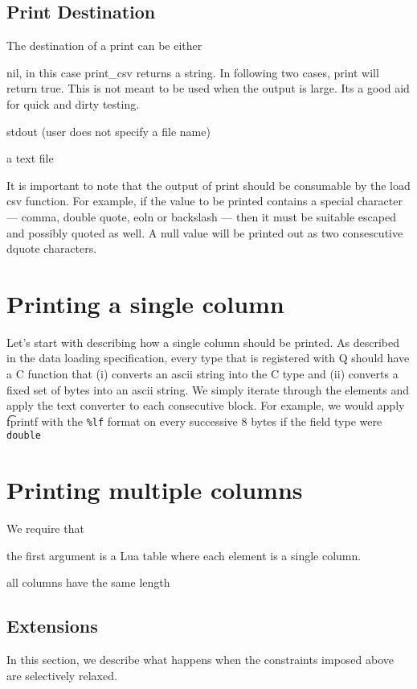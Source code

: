 \documentclass[letterpaper]{article}
\begin{document}
\subsection{Print Destination}

The destination of a print can be either 
\be
\item nil, in this case print\_csv returns a string. 
In following two cases, print will return true.  This is not meant to be used
when the output is large. Its  a good aid for quick and dirty testing.
\item stdout (user does not specify a file name)
\item a text file 
\ee

It is important to note that the output of print should be consumable by the
load csv function. For example, if the value to be printed contains a special
character --- comma, double quote, eoln or backslash --- then it must be
suitable escaped and possibly quoted as well. A null value will be printed out
as two consescutive dquote characters.

\section{Printing a single column}
\label{single_column}

Let's start with describing how a single column should be printed. As
described in the data loading specification, every type that is
registered with Q should have a C function that (i) converts an ascii
string into the C type and (ii) converts a fixed set of bytes into an ascii
string. We simply iterate through the elements and apply the text converter to
each consecutive block. For example, we would apply {\t fprintf} with the
\verb+%lf+ format on every successive 8 bytes if the field type were
{\tt double}

\section{Printing multiple columns}
\label{multiple_columns}

We require that 
\be
\item 
the first argument is a Lua table where each element is a single column. 
\item all columns have the same length
\ee

\subsection{Extensions}
In this section, we describe what happens when the constraints imposed above are
selectively relaxed.
\end{document}
